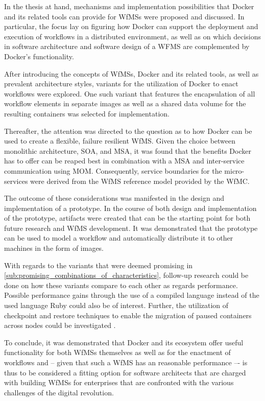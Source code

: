 
In the thesis at hand, mechanisms and implementation possibilities that Docker and its related tools can provide for \acp{WfMS} were proposed and discussed. In particular, the focus lay on figuring how Docker can support the deployment and execution of workflows in a distributed environment, as well as on which decisions in software architecture and software design of a WFMS are complemented by Docker's functionality.

After introducing the concepts of \acp{WfMS}, Docker and its related tools, as well as prevalent architecture styles, variants for the utilization of Docker to enact workflows were explored. One such variant that features the encapsulation of all workflow elements in separate images as well as a shared data volume for the resulting containers was selected for implementation.

Thereafter, the attention was directed to the question as to how Docker can be used to create a flexible, failure resilient \ac{WfMS}. Given the choice between monolithic architecture, \ac{SOA}, and \ac{MSA}, it was found that the benefits Docker has to offer can be reaped best in combination with a \ac{MSA} and inter-service communication using \ac{MOM}. Consequently, service boundaries for the micro-services were derived from the \ac{WfMS} reference model provided by the \ac{WfMC}.

The outcome of these considerations was manifested in the design and implementation of a prototype. In the course of both design and implementation of the prototype, artifacts were created that can be the starting point for both future research and \ac{WfMS} development. It was demonstrated that the prototype can be used to model a workflow and automatically distribute it to other machines in the form of images.

With regards to the variants that were deemed promising in \ref{sub:promising_combinations_of_characteristics}, follow-up research could be done on how these variants compare to each other as regards performance. Possible performance gains through the use of a compiled language instead of the used language Ruby could also be of interest. Further, the utilization of checkpoint and restore techniques to enable the migration of paused containers across nodes could be investigated \cite{Kim2015Checkpoint,Merker2015How}.

To conclude, it was demonstrated that Docker and its ecosystem offer useful functionality for both \acp{WfMS} themselves as well as for the enactment of workflows and -- given that such a \ac{WfMS} has an reasonable performance –- is thus to be considered a fitting option for software architects that are charged with building \acp{WfMS} for enterprises that are confronted with the various challenges of the digital revolution.
